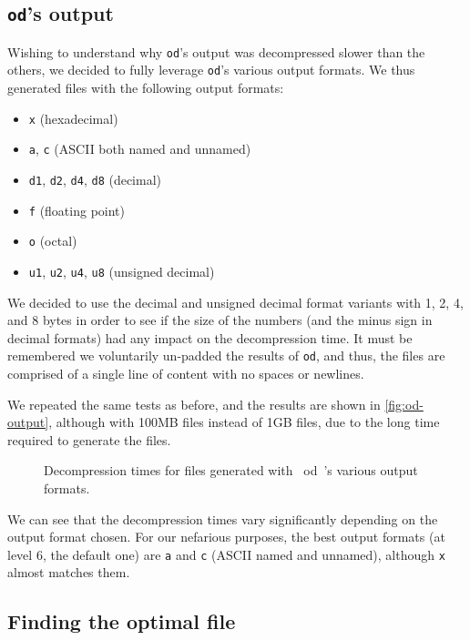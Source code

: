 \documentclass[a4paper,10pt,compsoc,conference]{IEEEtran}
\begin{document}
\subsection{\texttt{od}'s output}
\label{sec:org27060b5}

Wishing to understand why \texttt{od}'s output was decompressed slower than the
others, we decided to fully leverage \texttt{od}'s various output formats. We thus
generated files with the following output formats:

\begin{itemize}
\item \texttt{x} (hexadecimal)
\item \texttt{a}, \texttt{c} (ASCII both named and unnamed)
\item \texttt{d1}, \texttt{d2}, \texttt{d4}, \texttt{d8} (decimal)
\item \texttt{f} (floating point)
\item \texttt{o} (octal)
\item \texttt{u1}, \texttt{u2}, \texttt{u4}, \texttt{u8} (unsigned decimal)
\end{itemize}

We decided to use the decimal and unsigned decimal format variants with 1, 2,
4, and 8 bytes in order to see if the size of the numbers (and the minus sign
in decimal formats) had any impact on the decompression time. It must be
remembered we voluntarily un-padded the results of \texttt{od}, and thus, the files
are comprised of a single line of content with no spaces or newlines.

We repeated the same tests as before, and the results are shown in
\autoref{fig:od-output}, although with 100MB files instead of 1GB files, due
to the long time required to generate the files.

\begin{figure}[h!]
  \begin{center}
    
  \end{center}
  \caption{Decompression times for files generated with ~od~'s various output formats.}
  \label{fig:od-output}
\end{figure}

We can see that the decompression times vary significantly depending on the
output format chosen. For our nefarious purposes, the best output formats (at
level 6, the default one) are \texttt{a} and \texttt{c} (ASCII named and unnamed), although
\texttt{x} almost matches them.

\subsection{Finding the optimal file}
\label{sec:orgf7c9361}
\end{document}
